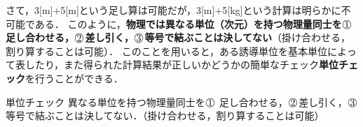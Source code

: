 さて，3[m]+5[m]という足し算は可能だが，3[m]+5[kg]という計算は明らかに不可能である．
このように，{\bf 物理では異なる単位（次元）を持つ物理量同士を$\MARU{1}$ 足し合わせる，$\MARU{2}$差し引く，$\MARU{3}$等号で結ぶことは決してない}（掛け合わせる，割り算することは可能）．
このことを用いると，ある誘導単位を基本単位によって表したり，また得られた計算結果が正しいかどうかの簡単なチェック{\bf 単位チェック}を行うことができる．

 
 \begin{matome}{単位チェック}
 \hspace{2mm} 異なる単位を持つ物理量同士を$\MARU{1}$ 足し合わせる，$\MARU{2}$差し引く，$\MARU{3}$等号で結ぶことは決してない．（掛け合わせる，割り算することは可能）
 \end{matome}
 
   \ 
 
